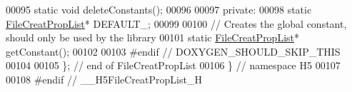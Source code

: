\begin{DoxyCode}
00095         \textcolor{keyword}{static} \textcolor{keywordtype}{void} deleteConstants();
00096 
00097     \textcolor{keyword}{private}:
00098         \textcolor{keyword}{static} \hyperlink{class_h5_1_1_file_creat_prop_list}{FileCreatPropList}* DEFAULT\_;
00099 
00100         \textcolor{comment}{// Creates the global constant, should only be used by the library}
00101         \textcolor{keyword}{static} \hyperlink{class_h5_1_1_file_creat_prop_list}{FileCreatPropList}* getConstant();
00102 
00103 \textcolor{preprocessor}{#endif // DOXYGEN\_SHOULD\_SKIP\_THIS}
00104 
00105 \}; \textcolor{comment}{// end of FileCreatPropList}
00106 \} \textcolor{comment}{// namespace H5}
00107 
00108 \textcolor{preprocessor}{#endif // \_\_H5FileCreatPropList\_H}
\end{DoxyCode}
